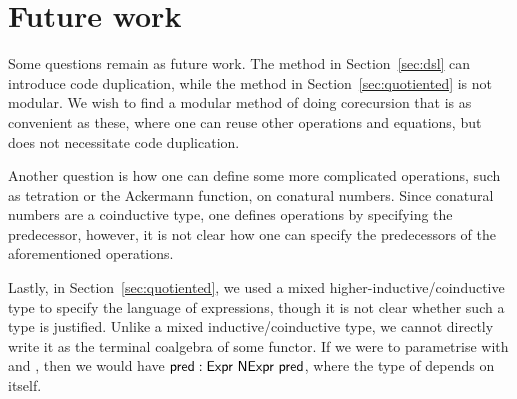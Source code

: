 \documentclass[sigplan, screen, natbib=false, review]{acmart}
\begin{document}
\section{Future work}

Some questions remain as future work. The method in Section~\ref{sec:dsl} can
introduce code duplication, while the method in Section~\ref{sec:quotiented} is
not modular. We wish to find a modular method of doing corecursion that is as
convenient as these, where one can reuse other operations and equations, but
does not necessitate code duplication.

Another question is how one can define some more complicated operations, such as
tetration or the Ackermann function, on conatural numbers. Since conatural
numbers are a coinductive type, one defines operations by specifying the
predecessor, however, it is not clear how one can specify the predecessors of
the aforementioned operations.

Lastly, in Section~\ref{sec:quotiented}, we used a mixed
higher-inductive/coinductive type to specify the language of expressions, though
it is not clear whether such a type is justified. Unlike a mixed
inductive/coinductive type, we cannot directly write it as the terminal
coalgebra of some functor. If we were to parametrise  with
 and , then we would have $\AgdaField{pred} :
\AgdaDatatype{Expr}\ \AgdaRecord{NExpr}\ \AgdaField{pred}$, where the type of
 depends on itself.

\printbibliography
\end{document}
